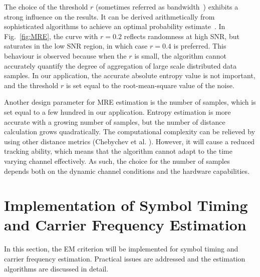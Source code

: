 \documentclass[12pt, draftclsnofoot, onecolumn]{IEEEtran}
\begin{document}
The choice of the threshold \(r\) (sometimes referred as bandwidth~\cite{Botev2010}) exhibits a strong influence on the results.
It can be derived arithmetically from sophisticated algorithms to achieve an optimal probability estimate~\cite{Botev2010}.
In Fig.~\ref{fig:MRE}, the curve with \(r=0.2\) reflects randomness at high SNR, but saturates in the low SNR region, in which case \(r=0.4\) is preferred.
This behaviour is observed because when the \(r\) is small, the algorithm cannot accurately quantify the degree of aggregation of large scale distributed data samples.
In our application, the accurate absolute entropy value is not important, and the threshold $r$ is set equal to the root-mean-square value of the noise.

Another design parameter for MRE estimation is the number of samples, which is set equal to a few hundred in our application.
Entropy estimation is more accurate with a growing number of samples, but the number of distance calculation grows quadratically.
The computational complexity can be relieved by 
using other distance metrics (Chebychev et al. \cite{Cha2007}).
However, it will cause a reduced tracking ability, which means that the algorithm cannot adapt to the time varying channel effectively.
As such, the choice for the number of samples depends both on the dynamic channel conditions and the hardware capabilities.
% 
% 

\section{Implementation of Symbol Timing and Carrier Frequency Estimation}
\label{sec:imple}
In this section, the EM criterion will be implemented for symbol timing and carrier frequency estimation.
Practical issues are addressed and the estimation algorithms are discussed in detail. 
\end{document}
